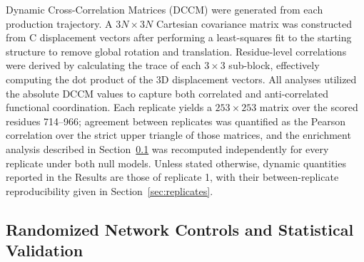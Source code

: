 \documentclass[utf8]{FrontiersinHarvard}
\begin{document}
Dynamic Cross-Correlation Matrices (DCCM) were generated from each production trajectory. A $3N\times3N$ Cartesian covariance matrix was constructed from C\textalpha{} displacement vectors after performing a least-squares fit to the starting structure to remove global rotation and translation. Residue-level correlations were derived by calculating the trace of each $3\times3$ sub-block, effectively computing the dot product of the 3D displacement vectors. All analyses utilized the absolute DCCM values to capture both correlated and anti-correlated functional coordination. Each replicate yields a $253\times253$ matrix over the scored residues 714--966; agreement between replicates was quantified as the Pearson correlation over the strict upper triangle of those matrices, and the enrichment analysis described in Section~\ref{sec:nulls} was recomputed independently for every replicate under both null models. Unless stated otherwise, dynamic quantities reported in the Results are those of replicate 1, with their between-replicate reproducibility given in Section~\ref{sec:replicates}.

\subsection{Randomized Network Controls and Statistical Validation}
\label{sec:nulls}
\end{document}
